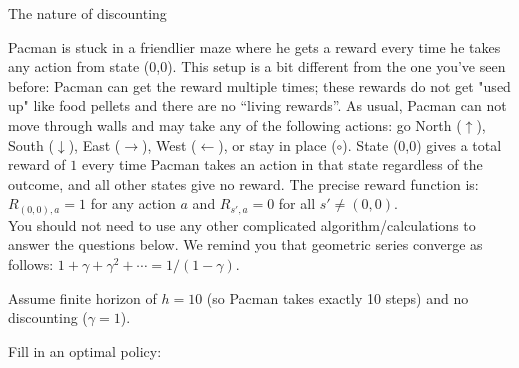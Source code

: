 \begin{problem}[]{The nature of discounting}

Pacman is stuck in a friendlier maze where he gets a reward every time he takes any action from state (0,0). This setup is a bit different from the one you've seen before: Pacman can get the reward multiple times; these rewards do not get "used up" like food pellets and there are no ``living rewards''.  As usual, Pacman can not move through walls and may take any of the following actions: go North ($\uparrow$), South ($\downarrow$), East ($\rightarrow$), West ($\leftarrow$), or stay in place ($\circ$). State (0,0) gives a total reward of $1$ every time Pacman takes an action in that state regardless of the outcome, and all other states give no reward. The precise reward function is: $R_{(0,0),a} = 1$ for any action $a$ and $R_{s',a}=0$ for all $s' \neq (0,0)$. \\

You should not need to use any other complicated algorithm/calculations to answer the questions below. We remind you that geometric series converge as follows:
$ 1 + \gamma + \gamma^2 + \cdots = 1/(1-\gamma)$.

\begin{question}[6]
Assume finite horizon of $h = 10$ (so Pacman takes exactly 10 steps) and no discounting ($\gamma = 1$).
\\

{\newcommand{\sep}{1cm}
\newcommand{\actionEast}{\solution{}{$\rightarrow$}}
\newcommand{\actionWest}{\solution{}{$\leftarrow$}}
\newcommand{\actionNorth}{\solution{}{$\uparrow$}}
\newcommand{\actionSouth}{\solution{}{$\downarrow$}}
\newcommand{\actionStay}{\solution{}{$\circ$}}

\begin{minipage}[t]{.5\textwidth}
\centering

Fill in an optimal policy:\\



\end{minipage}}
\end{question}
\end{problem}
